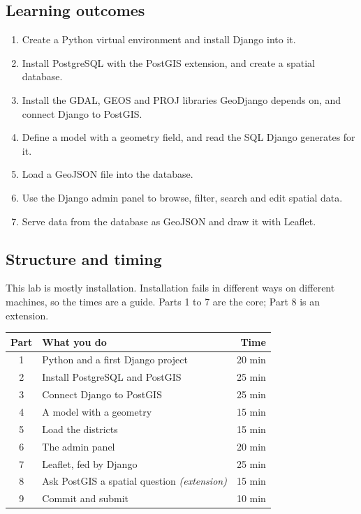 \documentclass{article}
\begin{document}
\subsection*{Learning outcomes}

\begin{enumerate}
  \item Create a Python virtual environment and install Django into it.
  \item Install PostgreSQL with the PostGIS extension, and create a
        spatial database.
  \item Install the GDAL, GEOS and PROJ libraries GeoDjango depends on,
        and connect Django to PostGIS.
  \item Define a model with a geometry field, and read the SQL Django
        generates for it.
  \item Load a GeoJSON file into the database.
  \item Use the Django admin panel to browse, filter, search and edit
        spatial data.
  \item Serve data from the database as GeoJSON and draw it with Leaflet.
\end{enumerate}

\subsection*{Structure and timing}

This lab is mostly installation. Installation fails in different ways on
different machines, so the times are a guide. Parts 1 to 7 are the core;
Part 8 is an extension.

\vspace{.6em}
\begin{tabularx}{\textwidth}{@{}c X r@{}}
\toprule
\textbf{Part} & \textbf{What you do} & \textbf{Time} \\
\midrule
1 & Python and a first Django project            & 20 min \\
2 & Install PostgreSQL and PostGIS               & 25 min \\
3 & Connect Django to PostGIS                    & 25 min \\
4 & A model with a geometry                      & 15 min \\
5 & Load the districts                           & 15 min \\
6 & The admin panel                              & 20 min \\
7 & Leaflet, fed by Django                       & 25 min \\
\midrule
8 & Ask PostGIS a spatial question \textit{(extension)} & 15 min \\
\midrule
9 & Commit and submit                            & 10 min \\
\bottomrule
\end{tabularx}
\end{document}
